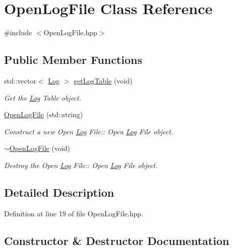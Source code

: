 \hypertarget{class_open_log_file}{}\section{Open\+Log\+File Class Reference}
\label{class_open_log_file}


{\ttfamily \#include $<$Open\+Log\+File.\+hpp$>$}

\subsection*{Public Member Functions}
\begin{DoxyCompactItemize}
\item 
std\+::vector$<$ \hyperlink{class_log}{Log} $>$ \hyperlink{class_open_log_file_ac18d5b3bc39aad3a0c2ebd761294716b}{get\+Log\+Table} (void)
\begin{DoxyCompactList}\small\item\em Get the \hyperlink{class_log}{Log} Table object. \end{DoxyCompactList}\item 
\hyperlink{class_open_log_file_a48f9d847a62a6cdc5d06b83f97023a08}{Open\+Log\+File} (std\+::string)
\begin{DoxyCompactList}\small\item\em Construct a new Open \hyperlink{class_log}{Log} File\+:\+: Open \hyperlink{class_log}{Log} File object. \end{DoxyCompactList}\item 
\hyperlink{class_open_log_file_a5583bd1705452a1c20291870539bcec0}{$\sim$\+Open\+Log\+File} (void)
\begin{DoxyCompactList}\small\item\em Destroy the Open \hyperlink{class_log}{Log} File\+:\+: Open \hyperlink{class_log}{Log} File object. \end{DoxyCompactList}\end{DoxyCompactItemize}


\subsection{Detailed Description}


Definition at line 19 of file Open\+Log\+File.\+hpp.



\subsection{Constructor \& Destructor Documentation}
\mbox{\label{class_open_log_file_a48f9d847a62a6cdc5d06b83f97023a08}} 
